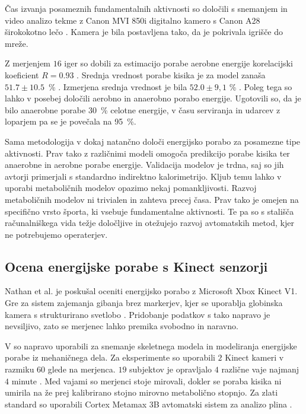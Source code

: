 Čas izvanja posameznih fundamentalnih aktivnosti so določili s snemanjem in video analizo tekme z Canon MVI 850i digitalno kamero s Canon A28 širokokotno lečo \cite{botton2011energy}. Kamera je bila postavljena %
tako, da je pokrivala igrišče do mreže. 

Z merjenjem $16$ iger so dobili za estimacijo porabe aerobne energije korelacijski koeficient $R = 0.93$ \cite{botton2011energy}. Srednja vrednost porabe kisika je za model zanaša $51.7 \pm 10.5$~\% \vomax. Izmerjena srednja vrednost je bila $52.0 \pm 9,1$ \% \vomax. Poleg tega so lahko 
v \cite{botton2011energy} posebej določili aerobno in anaerobno porabo energije. Ugotovili so, da je bilo anaerobne porabe \SI{30}{\%} celotne energije, v času serviranja in udarcev z loparjem pa se je povečala na \SI{95}{\%}.  

Sama metodologija v \cite{botton2011energy} dokaj natančno določi energijsko porabo za posamezne tipe aktivnosti. Prav tako z različnimi modeli omogoča predikcijo porabe kisika ter anaerobne in aerobne porabe energije. Validacija modelov je trdna, saj so jih avtorji primerjali s standardno indirektno kalorimetrijo. Kljub temu lahko v uporabi metaboličnih modelov opazimo nekaj pomankljivosti. Razvoj metaboličnih modelov ni trivialen in zahteva precej časa. Prav tako je omejen na specifično vrsto športa, ki vsebuje fundamentalne aktivnosti. Te pa so s stališča računalniškega vida težje določljive in otežujejo razvoj avtomatskih metod, kjer ne potrebujemo operaterjev.




\subsection{Ocena energijske porabe s Kinect senzorji}

Nathan et al. \cite{nathan2015estimating} je poskušal oceniti energijsko porabo z Microsoft Xbox Kinect V1. Gre za sistem zajemanja gibanja brez markerjev, kjer se uporablja globinska kamera s strukturirano svetlobo \cite{nathan2015estimating}. Pridobanje podatkov s tako napravo je nevsiljivo, zato se merjenec lahko premika svobodno in naravno. 

V \cite{nathan2015estimating} so napravo uporabili za snemanje skeletnega modela in modeliranja energijske porabe iz mehaničnega dela. Za eksperimente so uporabili $2$ Kinect kameri v razmiku \SI{60}{\stopinj} glede na merjenca. $19$ subjektov je opravljalo $4$ različne vaje najmanj $4$ minute \cite{nathan2015estimating}. Med vajami so merjenci stoje mirovali, dokler se poraba kisika ni umirila na že prej kalibrirano stojno mirovno metabolično stopnjo. Za zlati standard so uporabili Cortex Metamax 3B avtomatski sistem za analizo plina \cite{nathan2015estimating}.

